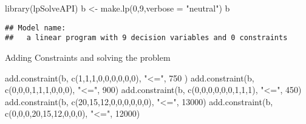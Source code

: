 \documentclass[
]{article}
\author{}
\date{\vspace{-2.5em}}
\newenvironment{Shaded}{\begin{snugshade}}{\end{snugshade}}
\newcommand{\AttributeTok}[1]{\textcolor[rgb]{0.77,0.63,0.00}{#1}}
\newcommand{\DecValTok}[1]{\textcolor[rgb]{0.00,0.00,0.81}{#1}}
\newcommand{\FunctionTok}[1]{\textcolor[rgb]{0.00,0.00,0.00}{#1}}
\newcommand{\NormalTok}[1]{#1}
\newcommand{\OtherTok}[1]{\textcolor[rgb]{0.56,0.35,0.01}{#1}}
\newcommand{\StringTok}[1]{\textcolor[rgb]{0.31,0.60,0.02}{#1}}
\begin{document}
\begin{Shaded}
\begin{Highlighting}[]
\FunctionTok{library}\NormalTok{(lpSolveAPI)}
\NormalTok{b }\OtherTok{\textless{}{-}} \FunctionTok{make.lp}\NormalTok{(}\DecValTok{0}\NormalTok{,}\DecValTok{9}\NormalTok{,}\AttributeTok{verbose =} \StringTok{"neutral"}\NormalTok{)}
\NormalTok{b}
\end{Highlighting}
\end{Shaded}

\begin{verbatim}
## Model name: 
##   a linear program with 9 decision variables and 0 constraints
\end{verbatim}

Adding Constraints and solving the problem

\begin{Shaded}
\begin{Highlighting}[]
\FunctionTok{add.constraint}\NormalTok{(b, }\FunctionTok{c}\NormalTok{(}\DecValTok{1}\NormalTok{,}\DecValTok{1}\NormalTok{,}\DecValTok{1}\NormalTok{,}\DecValTok{0}\NormalTok{,}\DecValTok{0}\NormalTok{,}\DecValTok{0}\NormalTok{,}\DecValTok{0}\NormalTok{,}\DecValTok{0}\NormalTok{,}\DecValTok{0}\NormalTok{), }\StringTok{"\textless{}="}\NormalTok{, }\DecValTok{750}\NormalTok{ )}
\FunctionTok{add.constraint}\NormalTok{(b, }\FunctionTok{c}\NormalTok{(}\DecValTok{0}\NormalTok{,}\DecValTok{0}\NormalTok{,}\DecValTok{0}\NormalTok{,}\DecValTok{1}\NormalTok{,}\DecValTok{1}\NormalTok{,}\DecValTok{1}\NormalTok{,}\DecValTok{0}\NormalTok{,}\DecValTok{0}\NormalTok{,}\DecValTok{0}\NormalTok{), }\StringTok{"\textless{}="}\NormalTok{, }\DecValTok{900}\NormalTok{)}
\FunctionTok{add.constraint}\NormalTok{(b, }\FunctionTok{c}\NormalTok{(}\DecValTok{0}\NormalTok{,}\DecValTok{0}\NormalTok{,}\DecValTok{0}\NormalTok{,}\DecValTok{0}\NormalTok{,}\DecValTok{0}\NormalTok{,}\DecValTok{0}\NormalTok{,}\DecValTok{1}\NormalTok{,}\DecValTok{1}\NormalTok{,}\DecValTok{1}\NormalTok{), }\StringTok{"\textless{}="}\NormalTok{, }\DecValTok{450}\NormalTok{)}
\FunctionTok{add.constraint}\NormalTok{(b, }\FunctionTok{c}\NormalTok{(}\DecValTok{20}\NormalTok{,}\DecValTok{15}\NormalTok{,}\DecValTok{12}\NormalTok{,}\DecValTok{0}\NormalTok{,}\DecValTok{0}\NormalTok{,}\DecValTok{0}\NormalTok{,}\DecValTok{0}\NormalTok{,}\DecValTok{0}\NormalTok{,}\DecValTok{0}\NormalTok{), }\StringTok{"\textless{}="}\NormalTok{, }\DecValTok{13000}\NormalTok{)}
\FunctionTok{add.constraint}\NormalTok{(b, }\FunctionTok{c}\NormalTok{(}\DecValTok{0}\NormalTok{,}\DecValTok{0}\NormalTok{,}\DecValTok{0}\NormalTok{,}\DecValTok{20}\NormalTok{,}\DecValTok{15}\NormalTok{,}\DecValTok{12}\NormalTok{,}\DecValTok{0}\NormalTok{,}\DecValTok{0}\NormalTok{,}\DecValTok{0}\NormalTok{), }\StringTok{"\textless{}="}\NormalTok{, }\DecValTok{12000}\NormalTok{)}

\end{Highlighting}
\end{Shaded}
\end{document}
